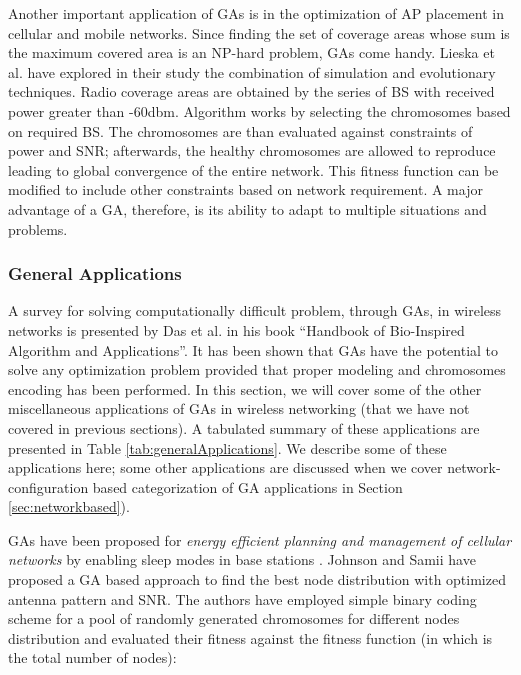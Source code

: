 \documentclass[journal]{IEEEtran}
\begin{document}
Another important application of GAs is in the optimization of AP placement in cellular and mobile networks. Since finding the set of coverage areas whose sum is the maximum covered area is an NP-hard problem, GAs come handy. Lieska et al. \cite{lieska1998radio} have explored in their study the combination of simulation and evolutionary techniques. Radio coverage areas are obtained by the series of BS with received power greater than -60dbm. Algorithm works by selecting the chromosomes based on required BS. The chromosomes are than evaluated against constraints of power and SNR; afterwards, the healthy chromosomes are allowed to reproduce leading to global convergence of the entire network. This fitness function can be modified to include other constraints based on network requirement. A major advantage of a GA, therefore, is its ability to adapt to multiple situations and problems.

\vspace{2mm}  
\subsubsection{General Applications}
\label{sec:GeneralApplications}

A survey for solving computationally difficult problem, through GAs, in wireless networks is presented by Das et al. \cite{das2006solving} in his book ``Handbook of Bio-Inspired Algorithm and Applications''. It has been shown that GAs have the potential to solve any optimization problem provided that proper modeling and chromosomes encoding has been performed. In this section, we will cover some of the other miscellaneous applications of GAs in wireless networking (that we have not covered in previous sections). A tabulated summary of these applications are presented in Table \ref{tab:generalApplications}. We describe some of these applications here; some other applications are discussed when we cover network-configuration based categorization of GA applications in Section \ref{sec:networkbased}).

\vspace{2mm}
GAs have been proposed for \textit{energy efficient planning and management of cellular networks} by enabling sleep modes in base stations \cite{chiaraviglio2012energy}. Johnson and Samii \cite{johnson1995genetic} have proposed a GA based approach to find the best node distribution with optimized antenna pattern and SNR. The authors have employed simple binary coding scheme for a pool of randomly generated chromosomes for different nodes distribution and evaluated their fitness against the fitness function (in which  is the total number of nodes):
\end{document}
